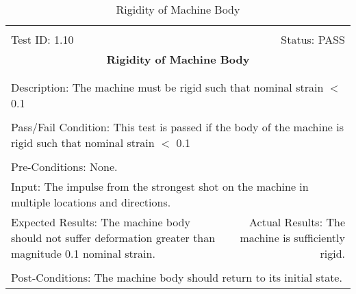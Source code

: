 \documentclass[titlepage]{article}
\begin{document}
\begin{center}
\begin{table}[h!]
\begin{tabular}{|l r|}\hline&\\[-2mm]
	Test ID:   1.10	&Status: PASS\\[-3mm]
	\multicolumn{2}{|c|}{\textbf{\large{Rigidity of Machine Body}}}\\&\\\hline&\\[-3mm]
	\multicolumn{2}{|p{\textwidth}|}{Description: The machine must be rigid such that nominal strain $<$ 0.1}\\[1mm]\hline&\\[-3mm]
	\multicolumn{2}{|p{\textwidth}|}{Pass/Fail Condition: This test is passed if the body of the machine is rigid such that nominal strain $<$ 0.1}\\[1mm]\hline&\\[-3mm]
	\multicolumn{2}{|p{\textwidth}|}{Pre-Conditions: None.}\\[4mm]
	\multicolumn{2}{|p{\textwidth}|}{Input: The impulse from the strongest shot on the machine in multiple locations and directions.}\\[2mm]\hline
	\multicolumn{1}{|p{0.49\textwidth}}{Expected Results: The machine body should not suffer deformation greater than magnitude 0.1 nominal strain.}	&\multicolumn{1}{|p{0.45\textwidth}|}{Actual Results: The machine is sufficiently rigid.}\\\hline&\\[-3mm]
	\multicolumn{2}{|p{\textwidth}|}{Post-Conditions: The machine body should return to its initial state.}\\\hline
\end{tabular}
\caption{Rigidity of Machine Body}
\end{table}
\end{center}
\end{document}
